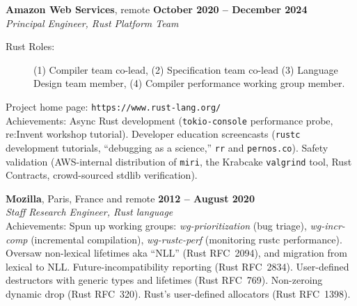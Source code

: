 \documentclass[margin,line,draft]{res}
\begin{document}
\begin{resume}
    \textbf{Amazon Web Services}, remote \hfill \textbf{October 2020 -- December 2024}\\\vspace{1mm}%
    \textsl{Principal Engineer, Rust Platform Team}
\begin{description}
\item[\rm Rust Roles:]
  (1) Compiler team co-lead, (2) Specification team co-lead (3) Language Design team member, (4) Compiler performance working group member.
\end{description}
    \vspace{-2mm}
    Project home page: {\tt https://www.rust-lang.org/} \\
    Achievements: Async Rust development (\texttt{tokio-console} performance probe, re:Invent workshop tutorial).
    Developer education screencasts (\texttt{rustc} development tutorials, ``debugging as a science,'' \texttt{rr} and \texttt{pernos.co}). Safety validation (AWS-internal distribution of \texttt{miri}, the Krabcake \texttt{valgrind} tool, Rust Contracts, crowd-sourced stdlib verification).

    \textbf{Mozilla}, Paris, France and remote \hfill \textbf{2012 -- August 2020}\\\vspace{1mm}%
    \textsl{Staff Research Engineer, Rust language} \\
    Achievements: Spun up working groups: \emph{wg-prioritization} (bug triage), \emph{wg-incr-comp} (incremental compilation), \emph{wg-rustc-perf} (monitoring rustc performance). Oversaw non-lexical lifetimes aka ``NLL'' (Rust RFC~2094), and migration from lexical to NLL. Future-incompatibility reporting (Rust RFC~2834). User-defined destructors with generic types and lifetimes (Rust RFC~769). Non-zeroing dynamic drop (Rust RFC~320). Rust's user-defined allocators (Rust RFC~1398).
    

\end{resume}
\end{document}
